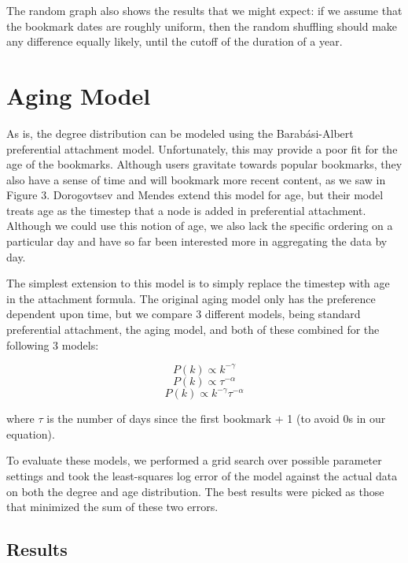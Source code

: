 \documentclass[11pt]{amsart}
\begin{document}
The random graph also shows the results that we might expect: if we assume that the bookmark dates are roughly uniform, then the random shuffling should make any difference equally likely, until the cutoff of the duration of a year.

\section{Aging Model}

As is, the degree distribution can be modeled using the Barab\'{a}si-Albert preferential attachment \cite{barabasi} model. Unfortunately, this may provide a poor fit for the age of the bookmarks. Although users gravitate towards popular bookmarks, they also have a sense of time and will bookmark more recent content, as we saw in Figure 3. Dorogovtsev and Mendes \cite{aging} extend this model for age, but their model treats age as the timestep that a node is added in preferential attachment. Although we could use this notion of age, we also lack the specific ordering on a particular day and have so far been interested more in aggregating the data by day.

The simplest extension to this model is to simply replace the timestep with age in the attachment formula. The original aging model only has the preference dependent upon time, but we compare 3 different models, being standard preferential attachment, the aging model, and both of these combined for the following 3 models:

\begin{equation} P(k) \propto k^{-\gamma} \label{eq:pa}\end{equation}
\begin{equation} P(k) \propto \tau^{-\alpha} \label{eq:aging}\end{equation}
\begin{equation} P(k) \propto k^{-\gamma}\tau^{-\alpha} \label{eq:combined}\end{equation}

where $\tau$ is the number of days since the first bookmark + 1 (to avoid 0s in our equation).

To evaluate these models, we performed a grid search over possible parameter settings and took the least-squares log error of the model against the actual data on both the degree and age distribution. The best results were picked as those that minimized the sum of these two errors.

\subsection{Results}
\end{document}
